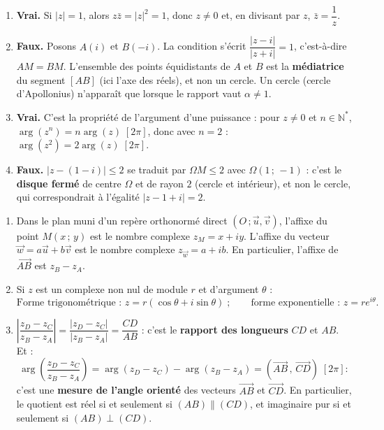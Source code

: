 \documentclass[11pt]{article}
\newcommand{\cle}[1]{{\popxbold\color{popdark}#1}}
\begin{document}
\begin{corrige}
\begin{enumerate}
\item \textbf{Vrai.} Si $|z| = 1$, alors $z\bar{z} = |z|^2 = 1$, donc $z \neq 0$ et, en divisant par $z$, $\bar{z} = \dfrac{1}{z}$.
\item \textbf{Faux.} Posons $A(i)$ et $B(-i)$. La condition s'écrit $\dfrac{|z - i|}{|z + i|} = 1$, c'est-à-dire $AM = BM$. L'ensemble des points équidistants de $A$ et $B$ est la \textbf{médiatrice} du segment $[AB]$ (ici l'axe des réels), et non un cercle. Un cercle (cercle d'Apollonius) n'apparaît que lorsque le rapport vaut $\alpha \neq 1$.
\item \textbf{Vrai.} C'est la propriété de l'argument d'une puissance : pour $z \neq 0$ et $n \in \mathbb{N}^*$, $\arg(z^n) = n\arg(z)\;[2\pi]$, donc avec $n = 2$ : $\arg(z^2) = 2\arg(z)\;[2\pi]$.
\item \textbf{Faux.} $|z - (1 - i)| \leq 2$ se traduit par $\Omega M \leq 2$ avec $\Omega(1\,;\,-1)$ : c'est le \textbf{disque fermé} de centre $\Omega$ et de rayon $2$ (cercle et intérieur), et non le cercle, qui correspondrait à l'égalité $|z - 1 + i| = 2$.
\end{enumerate}
\end{corrige}

\begin{corrige}
\begin{enumerate}
\item Dans le plan muni d'un repère orthonormé direct $(O\,;\vec{u},\vec{v})$, l'\cle{affixe} du point $M(x\,;\,y)$ est le nombre complexe $z_M = x + iy$. L'\cle{affixe} du vecteur $\vec{w} = a\vec{u} + b\vec{v}$ est le nombre complexe $z_{\vec{w}} = a + ib$. En particulier, l'affixe de $\overrightarrow{AB}$ est $z_B - z_A$.
\item Si $z$ est un complexe non nul de module $r$ et d'argument $\theta$ :
\[ \text{Forme trigonométrique : } z = r(\cos\theta + i\sin\theta) \;; \qquad \text{forme exponentielle : } z = re^{i\theta}. \]
\item $\left|\dfrac{z_D - z_C}{z_B - z_A}\right| = \dfrac{|z_D - z_C|}{|z_B - z_A|} = \dfrac{CD}{AB}$ : c'est le \textbf{rapport des longueurs} $CD$ et $AB$. Et :
\[ \arg\left(\frac{z_D - z_C}{z_B - z_A}\right) = \arg(z_D - z_C) - \arg(z_B - z_A) = \left(\overrightarrow{AB}\,,\,\overrightarrow{CD}\right)\;[2\pi] : \]
c'est une \textbf{mesure de l'angle orienté} des vecteurs $\overrightarrow{AB}$ et $\overrightarrow{CD}$. En particulier, le quotient est réel si et seulement si $(AB) \parallel (CD)$, et imaginaire pur si et seulement si $(AB) \perp (CD)$.
\end{enumerate}
\end{corrige}
\end{document}
